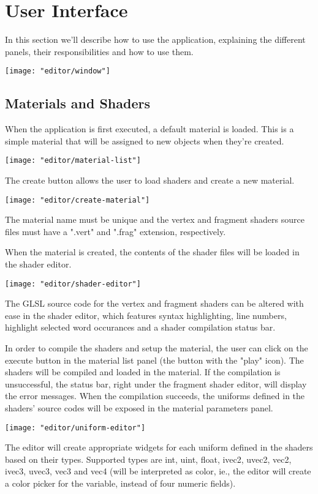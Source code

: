 \section{User Interface}
In this section we'll describe how to use the application, explaining the different panels, their responsibilities and how to use them.

\texttt{[image: "editor/window"]}

\subsection{Materials and Shaders}
When the application is first executed, a default material is loaded. This is a simple material that will be assigned to new objects when they're created.

\texttt{[image: "editor/material-list"]}

The create button allows the user to load shaders and create a new material.

\texttt{[image: "editor/create-material"]}

The material name must be unique and the vertex and fragment shaders source files must have a ".vert" and ".frag" extension, respectively.

When the material is created, the contents of the shader files will be loaded in the shader editor.

\texttt{[image: "editor/shader-editor"]}

The GLSL source code for the vertex and fragment shaders can be altered with ease in the shader editor, which features syntax highlighting, line numbers, highlight selected word occurances and a shader compilation status bar.

In order to compile the shaders and setup the material, the user can click on the execute button in the material list panel (the button with the "play" icon). The shaders will be compiled and loaded in the material. If the compilation is unsuccessful, the status bar, right under the fragment shader editor, will display the error messages. When the compilation succeeds, the uniforms defined in the shaders' source codes will be exposed in the material parameters panel.

\texttt{[image: "editor/uniform-editor"]}

The editor will create appropriate widgets for each uniform defined in the shaders based on their types. Supported types are int, uint, float, ivec2, uvec2, vec2, ivec3, uvec3, vec3 and vec4 (will be interpreted as color, ie., the editor will create a color picker for the variable, instead of four numeric fields).

